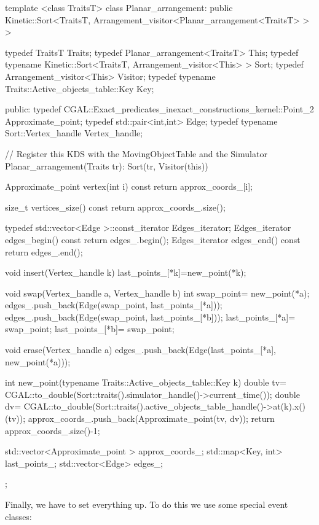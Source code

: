 \begin{ccExampleCode}

template <class TraitsT> 
class Planar_arrangement: 
  public Kinetic::Sort<TraitsT, 
		       Arrangement_visitor<Planar_arrangement<TraitsT> > > {
  typedef TraitsT Traits;
  typedef Planar_arrangement<TraitsT> This;
  typedef typename Kinetic::Sort<TraitsT,
				 Arrangement_visitor<This> > Sort;
  typedef Arrangement_visitor<This> Visitor;
  typedef typename Traits::Active_objects_table::Key Key;

public:
  typedef CGAL::Exact_predicates_inexact_constructions_kernel::Point_2 Approximate_point;
  typedef std::pair<int,int> Edge;
  typedef typename Sort::Vertex_handle Vertex_handle; 

  // Register this KDS with the MovingObjectTable and the Simulator
  Planar_arrangement(Traits tr): Sort(tr, Visitor(this)) {}

  Approximate_point vertex(int i) const
  {
    return approx_coords_[i];
  }

  size_t vertices_size() const
  {
    return approx_coords_.size();
  }

  typedef std::vector<Edge >::const_iterator Edges_iterator;
  Edges_iterator edges_begin() const
  {
    return edges_.begin();
  }
  Edges_iterator edges_end() const
  {
    return edges_.end();
  }

  void insert(Vertex_handle k) {
    last_points_[*k]=new_point(*k);
  }

  void swap(Vertex_handle a, Vertex_handle b) {
    int swap_point= new_point(*a);
    edges_.push_back(Edge(swap_point, last_points_[*a]));
    edges_.push_back(Edge(swap_point, last_points_[*b]));
    last_points_[*a]= swap_point;
    last_points_[*b]= swap_point;
  }

  void erase(Vertex_handle a) {
    edges_.push_back(Edge(last_points_[*a], new_point(*a)));
  }

  int new_point(typename Traits::Active_objects_table::Key k) {
    double tv= CGAL::to_double(Sort::traits().simulator_handle()->current_time());
    double dv= CGAL::to_double(Sort::traits().active_objects_table_handle()->at(k).x()(tv));
    approx_coords_.push_back(Approximate_point(tv, dv));
    return approx_coords_.size()-1;
  }

  std::vector<Approximate_point > approx_coords_;
  std::map<Key, int> last_points_;
  std::vector<Edge> edges_;

};
\end{ccExampleCode}

Finally, we have to set everything up. To do this we use some special
event classes: 

